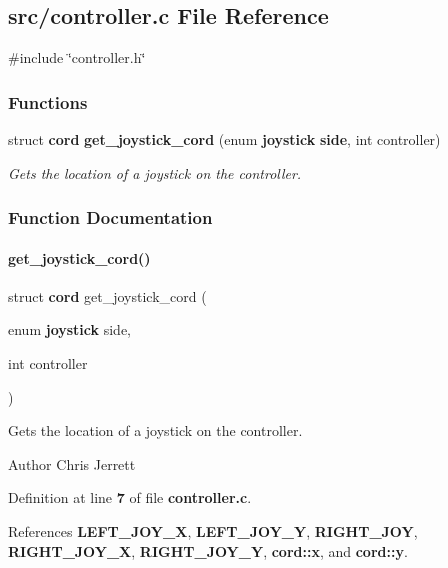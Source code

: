 \subsection{src/controller.c File Reference}
\label{controller_8c}
{\ttfamily \#include \char`\"{}controller.\+h\char`\"{}}\newline
\subsubsection*{Functions}
\begin{DoxyCompactItemize}
\item 
struct \textbf{ cord} \textbf{ get\+\_\+joystick\+\_\+cord} (enum \textbf{ joystick} \textbf{ side}, int controller)
\begin{DoxyCompactList}\small\item\em Gets the location of a joystick on the controller. \end{DoxyCompactList}\end{DoxyCompactItemize}


\subsubsection{Function Documentation}
\mbox{\label{controller_8c_a0ce0176099c0bb15ad8c36123222059d}} 
\paragraph{get\+\_\+joystick\+\_\+cord()}
{\footnotesize\ttfamily struct \textbf{ cord} get\+\_\+joystick\+\_\+cord (\begin{DoxyParamCaption}\item[{enum \textbf{ joystick}}]{side,  }\item[{int}]{controller }\end{DoxyParamCaption})}



Gets the location of a joystick on the controller. 

\begin{DoxyAuthor}{Author}
Chris Jerrett 
\end{DoxyAuthor}


Definition at line \textbf{ 7} of file \textbf{ controller.\+c}.



References \textbf{ L\+E\+F\+T\+\_\+\+J\+O\+Y\+\_\+X}, \textbf{ L\+E\+F\+T\+\_\+\+J\+O\+Y\+\_\+Y}, \textbf{ R\+I\+G\+H\+T\+\_\+\+J\+OY}, \textbf{ R\+I\+G\+H\+T\+\_\+\+J\+O\+Y\+\_\+X}, \textbf{ R\+I\+G\+H\+T\+\_\+\+J\+O\+Y\+\_\+Y}, \textbf{ cord\+::x}, and \textbf{ cord\+::y}.

